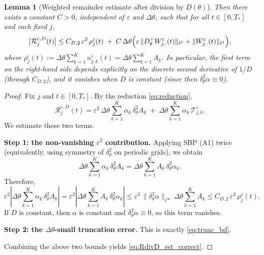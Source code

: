 \documentclass[11pt, dina4, amsfont12]{article}
\newtheorem{lemma}{Lemma}[section]
\begin{document}
\begin{lemma}[Weighted remainder estimate after division by $D(\theta)$]
Then there exists a constant $C>0$, independent of $\varepsilon$ and $\Delta\theta$, such that
for all $t\in[0,T_*]$ and each fixed $j$,
\begin{equation}\label{eq:RdivD_est_final}
\bigl|\mathcal R_{j}^{\varepsilon,D}(t)\bigr|
\le
C_{D,2}\,\varepsilon^2\,\rho_j^\varepsilon(t)
\;+\;
C\,\Delta\theta\Bigl(
\varepsilon\,\|D_\theta^+W_{j,\cdot}^\varepsilon(t)\|_{\ell^1}
+
\|W_{j,\cdot}^\varepsilon(t)\|_{\ell^1}
\Bigr),
\end{equation}
where $\rho_j^\varepsilon(t):=\Delta\theta\sum_{k=1}^K n_{j,k}^\varepsilon(t)=\Delta\theta\sum_{k=1}^K A_k$.
In particular, the first term on the right-hand side depends explicitly on the discrete
second derivative of $1/D$ (through $C_{D,2}$), and it vanishes when $D$ is constant (since then
$\delta_\theta^2\alpha\equiv 0$).
\end{lemma}


\begin{proof}
Fix $j$ and $t\in[0,T_*]$. By the reduction \eqref{eq:reduction},
\[
\mathcal R_{j}^{\varepsilon,D}(t)
=
\varepsilon^2\,\Delta\theta\sum_{k=1}^K \alpha_k\,\delta_\theta^2 A_k
\;+\;
\Delta\theta\sum_{k=1}^K \alpha_k\,\mathcal T_{j,k}^\varepsilon .
\]
We estimate these two terms.

\medskip\noindent
{\bf Step 1: the non-vanishing $\varepsilon^2$ contribution.}
Applying SBP (A1) twice (equivalently, using symmetry of $\delta_\theta^2$ on periodic grids),
we obtain
\[
\Delta\theta\sum_{k=1}^K \alpha_k\,\delta_\theta^2 A_k
=
\Delta\theta\sum_{k=1}^K A_k\,\delta_\theta^2 \alpha_k .
\]
Therefore,
\[
\varepsilon^2\left|\Delta\theta\sum_{k=1}^K \alpha_k\,\delta_\theta^2 A_k\right|
=
\varepsilon^2\left|\Delta\theta\sum_{k=1}^K A_k\,\delta_\theta^2 \alpha_k\right|
\le
\varepsilon^2\,\|\delta_\theta^2\alpha\|_{\ell^\infty}\,\Delta\theta\sum_{k=1}^K A_k
\le
C_{D,2}\,\varepsilon^2\,\rho_j^\varepsilon(t).
\]
If $D$ is constant, then $\alpha$ is constant and $\delta_\theta^2\alpha\equiv 0$, so this term vanishes.

\medskip\noindent
{\bf Step 2: the $\Delta\theta$-small truncation error.}
This is exactly \eqref{eq:trunc_bd}.

\medskip
Combining the above two bounds yields \eqref{eq:RdivD_est_correct}.
\end{proof}



\end{document}
